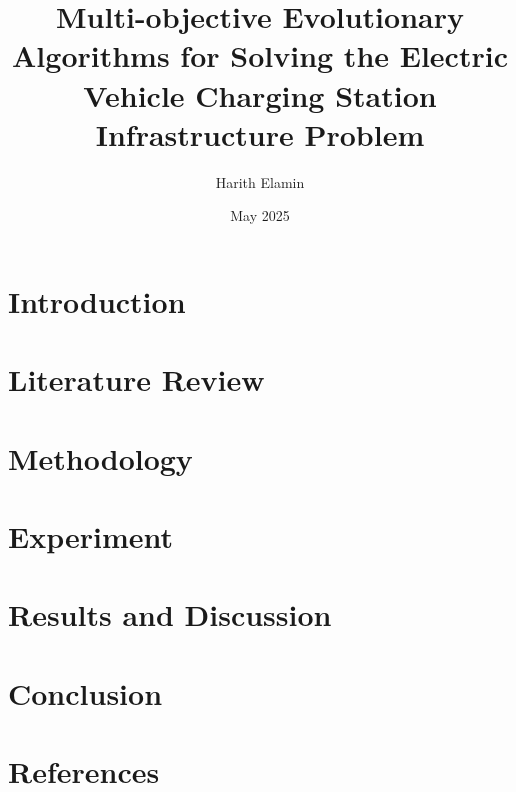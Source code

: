 \documentclass[12pt]{report}
\title{Multi-objective Evolutionary Algorithms for Solving the Electric Vehicle Charging Station Infrastructure Problem}
\author{Harith Elamin}
\date{May 2025}
\begin{document}
\maketitle

\tableofcontents
\newpage

\listoffigures
\newpage



\chapter{Introduction}



\chapter{Literature Review}

\chapter{Methodology}


\chapter{Experiment}

\chapter{Results and Discussion}

\chapter{Conclusion}


\chapter{References}

\end{document}

